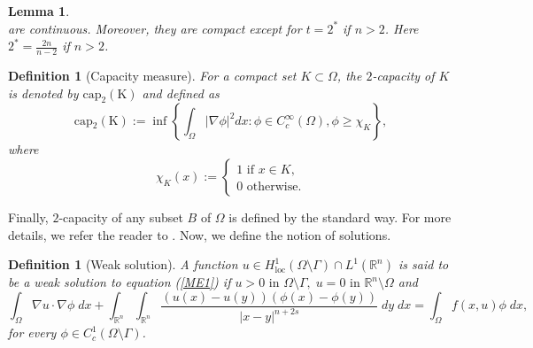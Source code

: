 \documentclass[11pt, notitlepage]{article}
\def\R{\mathbb{R}}
\newtheorem{Lemma}[Theorem]{Lemma}
\newtheorem{Definition}[Theorem]{Definition}
\begin{document}
{\begin{Lemma}
\[\]
are continuous. Moreover, they are compact except for $t=2^*$ if $n>2$. Here $2^*=\frac{2n}{n-2}$ if $n>2$.
\end{Lemma}
\begin{Definition}[Capacity measure]
    For a compact set $K\subset\Omega$, the $2$-capacity of $K$ is denoted by $\mathrm{cap_{\text{$2$}}(K)}$ and defined as
$$\mathrm{cap\text{$_2$}(K)}:=\inf \left \{ \int_\Omega|\nabla\phi|^2 dx : \phi\in C^\infty_c(\Omega), \phi\geq \chi_K \right \},$$
where $$\chi_K(x):=\begin{cases}
    1\text{ if } x\in K,\\
    0 \text{ otherwise.}
\end{cases}$$
\end{Definition}
Finally, $2$-capacity of any subset $B$ of $\Omega$ is defined by the standard way. For more details, we refer the reader to \cite{EvansG}. Now, we define the notion of solutions.
\begin{Definition}[Weak solution]\label{def1}
    A function $u\in  H^1_{\mathrm{loc}}(\Omega\setminus\Gamma)\cap L^1(\R^n)$ is said to be a weak solution to equation (\ref{ME1}) if $u>0 \text{ in }\Omega\setminus\Gamma,\;u=0\text{ in }\R^n\setminus\Omega$ and
    $$\int_\Omega \nabla u\cdot\nabla\phi\;dx+\int_{\R^n}\int_{\R^n}\frac{(u(x)-u(y))(\phi(x)-\phi(y))}{|x-y|^{n+2s}}\;dy\;dx=\int_\Omega f(x,u)\phi\;dx,$$
    for every $\phi\in C^1_c(\Omega\setminus\Gamma)$.
\end{Definition}

}
\end{document}

